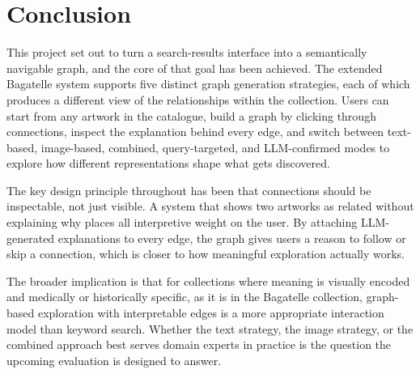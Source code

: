 \documentclass[12pt, a4paper]{article}
\begin{document}
\section{Conclusion}

This project set out to turn a search-results interface into a semantically navigable graph, and
the core of that goal has been achieved. The extended Bagatelle system supports five distinct
graph generation strategies, each of which produces a different view of the relationships within
the collection. Users can start from any artwork in the catalogue, build a graph by clicking
through connections, inspect the explanation behind every edge, and switch between text-based,
image-based, combined, query-targeted, and LLM-confirmed modes to explore how different
representations shape what gets discovered.

The key design principle throughout has been that connections should be inspectable, not just
visible. A system that shows two artworks as related without explaining why places all
interpretive weight on the user. By attaching LLM-generated explanations to every edge, the
graph gives users a reason to follow or skip a connection, which is closer to how meaningful
exploration actually works.

The broader implication is that for collections where meaning is visually encoded and medically
or historically specific, as it is in the Bagatelle collection, graph-based exploration with
interpretable edges is a more appropriate interaction model than keyword search. Whether the
text strategy, the image strategy, or the combined approach best serves domain experts in
practice is the question the upcoming evaluation is designed to answer.
\end{document}
